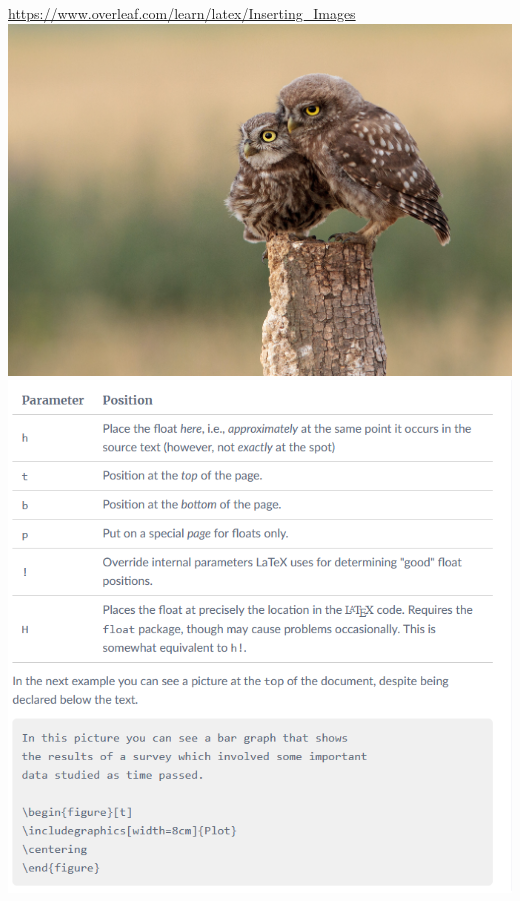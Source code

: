 \documentclass{article}
\begin{document}
\url{https://www.overleaf.com/learn/latex/Inserting_Images}
\includegraphics[scale=0.05]{sowa}
\includegraphics[scale=0.7]{pozycjonowanie}
\end{document}
